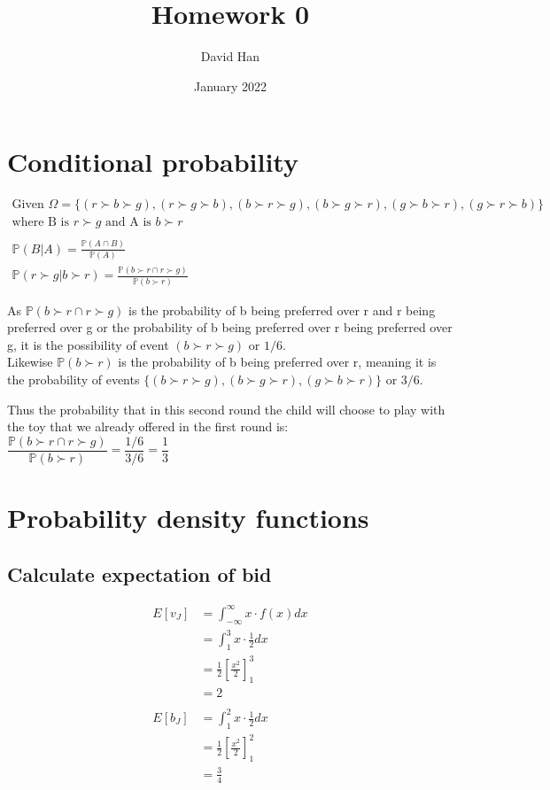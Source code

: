 \documentclass[12pt]{article}
\title{Homework 0}
\author{David Han}
\date{January 2022}
\newcommand{\bbP}{\mathbb{P}}
\renewcommand{\_}[1]{\underline{ #1 }}
\theoremstyle{definition}
\numberwithin{equation}{subsection}
\begin{document}
\maketitle

\section{Conditional probability}
\begin{gather*}
\text{Given $\Omega = \{(r \succ b \succ g), (r \succ g \succ b), (b \succ r \succ g), (b \succ g \succ r), (g \succ b \succ r), (g \succ r \succ b)\}$} \\
\text{where B is $r \succ g$ and A is $b \succ r$} \\ \\
\bbP(B|A)=\frac{\bbP(A\cap B)}{\bbP(A)} \\
\bbP(r \succ g | b \succ r)=\frac{\bbP(b \succ r \cap r \succ g)}{\bbP(b \succ r)}
\end{gather*}

As $\bbP(b \succ r \cap r \succ g)$ is the probability of b being preferred over r and r being preferred over g or the probability of b being preferred over r being preferred over g, it is the possibility of event $(b \succ r \succ g)$ or $1/6$. \\

Likewise $\bbP(b \succ r)$ is the probability of b being preferred over r, meaning it is the probability of events $\{(b \succ r \succ g), (b \succ g \succ r), (g \succ b \succ r)\}$ or $3/6$.

\begin{center}
Thus the probability that in this second round the child will choose to play with the toy that we already offered in the first round is: \\
$\dfrac{\bbP(b \succ r \cap r \succ g)}{\bbP(b \succ r)}=\dfrac{1/6}{3/6}=\dfrac{1}{3}$
\end{center}

\section{Probability density functions}
\subsection{Calculate expectation of bid}
\begin{align*}
E[v_J]&=\int_{-\infty}^{\infty}x\cdot f(x)dx \\
&=\int_{1}^{3}x\cdot \frac{1}{2}dx \\
&=\frac{1}{2} \left[ \frac{x^2}{2} \right]_{1}^{3} \\
&=2 \\ \\
E[b_J]&=\int_{1}^{2}x\cdot \frac{1}{2}dx \\
&=\frac{1}{2} \left[ \frac{x^2}{2} \right]_{1}^{2} \\
&=\frac{3}{4}
\end{align*}
\end{document}
